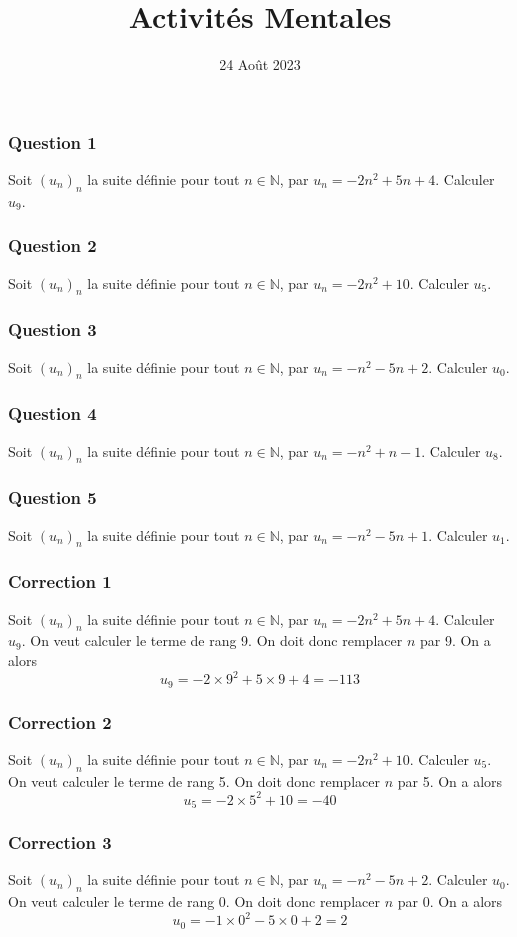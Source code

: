 \documentclass[15pt, mathserif]{beamer}
\title{Activités Mentales}
\date{24 Août 2023}
\newcommand{\N}{\mathbb{N}}			%
\begin{document}
\begin{frame}
    \titlepage
\end{frame}

\begin{frame} 
	\frametitle{Question 1}
Soit $(u_n)_n$ la suite définie pour tout $n \in \N$, par $u_n=-2n^2+5n+4$. Calculer $u_{9}$.\end{frame}


\begin{frame} 
	\frametitle{Question 2}
Soit $(u_n)_n$ la suite définie pour tout $n \in \N$, par $u_n=-2n^2+10$. Calculer $u_{5}$.\end{frame}


\begin{frame} 
	\frametitle{Question 3}
Soit $(u_n)_n$ la suite définie pour tout $n \in \N$, par $u_n=-n^2-5n+2$. Calculer $u_{0}$.\end{frame}


\begin{frame} 
	\frametitle{Question 4}
Soit $(u_n)_n$ la suite définie pour tout $n \in \N$, par $u_n=-n^2+n-1$. Calculer $u_{8}$.\end{frame}


\begin{frame} 
	\frametitle{Question 5}
Soit $(u_n)_n$ la suite définie pour tout $n \in \N$, par $u_n=-n^2-5n+1$. Calculer $u_{1}$.\end{frame}


\begin{frame}
\vspace{-10mm}
	\frametitle{Correction 1}
Soit $(u_n)_n$ la suite définie pour tout $n \in \N$, par $u_n=-2n^2+5n+4$. Calculer $u_{9}$. 
 \vfil 
  On veut calculer le terme de rang 9. 
 \vfil 
 On doit donc remplacer $n$ par 9. On a alors $$u_{9}=-2\times 9^2+5\times9+4=-113$$\end{frame}


\begin{frame}
\vspace{-10mm}
	\frametitle{Correction 2}
Soit $(u_n)_n$ la suite définie pour tout $n \in \N$, par $u_n=-2n^2+10$. Calculer $u_{5}$. 
 \vfil 
  On veut calculer le terme de rang 5. 
 \vfil 
 On doit donc remplacer $n$ par 5. On a alors $$u_{5}=-2\times 5^2+10=-40$$\end{frame}


\begin{frame}
\vspace{-10mm}
	\frametitle{Correction 3}
Soit $(u_n)_n$ la suite définie pour tout $n \in \N$, par $u_n=-n^2-5n+2$. Calculer $u_{0}$. 
 \vfil 
  On veut calculer le terme de rang 0. 
 \vfil 
 On doit donc remplacer $n$ par 0. On a alors $$u_{0}=-1\times 0^2-5\times0+2=2$$\end{frame}
\end{document}
